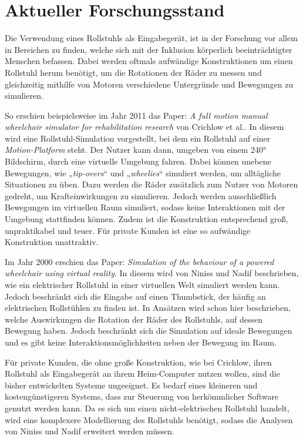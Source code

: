 \chapter{Aktueller Forschungsstand}
Die Verwendung eines Rollstuhls als Eingabegerät, ist in der Forschung vor allem in Bereichen zu finden, welche sich mit der Inklusion körperlich beeinträchtigter Menschen befassen.
Dabei werden oftmals aufwändige Konstruktionen um einen Rollstuhl herum benötigt, um die Rotationen der Räder zu messen und gleichzeitig mithilfe von Motoren verschiedene Untergründe und Bewegungen zu simulieren.

So erschien beispielsweise im Jahr 2011 das Paper: \textit{A full motion manual \\wheelchair simulator for rehabilitation research} von Crichlow et al.\cite{crichlowFullMotionManual2011}.
In diesem wird eine Rollstuhl-Simulation vorgestellt, bei dem ein Rollstuhl auf einer \textit{Motion-Platform} steht.
Der Nutzer kann dann, umgeben von einem 240° Bildschirm, durch eine virtuelle Umgebung fahren.
Dabei können unebene Bewegungen, wie „\textit{tip-overs}“ und „\textit{wheelies}“ simuliert werden, um alltägliche Situationen zu üben\cite{crichlowFullMotionManual2011}.
Dazu werden die Räder zusätzlich zum Nutzer von Motoren gedreht, um Krafteinwirkungen zu simulieren.
Jedoch werden ausschließlich Bewegungen im virtuellen Raum simuliert, sodass keine Interaktionen mit der Umgebung stattfinden können.
Zudem ist die Konstruktion entsprechend groß, unpraktikabel und teuer.
Für private Kunden ist eine so aufwändige Konstruktion unattraktiv.

Im Jahr 2000 erschien das Paper: \textit{Simulation of the behaviour of a powered wheelchair using virtual reality}\cite{ninissSimulationBehaviourPowered2000}.
In diesem wird von Niniss und Nadif beschrieben, wie ein elektrischer Rollstuhl in einer virtuellen Welt simuliert werden kann.
Jedoch beschränkt sich die Eingabe auf einen Thumbstick, der häufig an elektrischen Rollstühlen zu finden ist.
In Ansätzen wird schon hier beschrieben, welche Auswirkungen die Rotation der Räder des Rollstuhls, auf dessen Bewegung haben.
Jedoch beschränkt sich die Simulation auf ideale Bewegungen und es gibt keine Interaktionsmöglichkeiten neben der Bewegung im Raum.

Für private Kunden, die ohne große Konstruktion, wie bei Crichlow, ihren Rollstuhl als Eingabegerät an ihrem Heim-Computer nutzen wollen, sind die bisher entwickelten Systeme ungeeignet.
Es bedarf eines kleineren und kostengünstigeren Systems, dass zur Steuerung von herkömmlicher Software genutzt werden kann.
Da es sich um einen nicht-elektrischen Rollstuhl handelt, wird eine komplexere Modellierung des Rollstuhls benötigt, sodass die Analysen von Niniss und Nadif erweitert werden müssen.